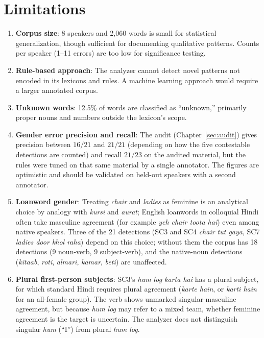 \documentclass[11pt,a4paper]{report}
\begin{document}
\section{Limitations}
\label{sec:limits}

\begin{enumerate}
  \item \textbf{Corpus size}: 8 speakers and 2,060 words is small for statistical generalization, though sufficient for documenting qualitative patterns. Counts per speaker (1--11 errors) are too low for significance testing.
  \item \textbf{Rule-based approach}: The analyzer cannot detect novel patterns not encoded in its lexicons and rules. A machine learning approach would require a larger annotated corpus.
  \item \textbf{Unknown words}: 12.5\% of words are classified as ``unknown,'' primarily proper nouns and numbers outside the lexicon's scope.
  \item \textbf{Gender error precision and recall}: The audit (Chapter~\ref{sec:audit}) gives precision between $16/21$ and $21/21$ (depending on how the five contestable detections are counted) and recall $21/23$ on the audited material, but the rules were tuned on that same material by a single annotator. The figures are optimistic and should be validated on held-out speakers with a second annotator.
  \item \textbf{Loanword gender}: Treating \textit{chair} and \textit{ladies} as feminine is an analytical choice by analogy with \textit{kursi} and \textit{aurat}; English loanwords in colloquial Hindi often take masculine agreement (for example \textit{yeh chair toota hai}) even among native speakers. Three of the 21 detections (SC3 and SC4 \textit{chair tut gaya}, SC7 \textit{ladies door khol raha}) depend on this choice; without them the corpus has 18 detections (9 noun-verb, 9 subject-verb), and the native-noun detections (\textit{kitaab}, \textit{roti}, \textit{almari}, \textit{kamar}, \textit{beti}) are unaffected.
  \item \textbf{Plural first-person subjects}: SC3's \textit{hum log karta hai} has a plural subject, for which standard Hindi requires plural agreement (\textit{karte hain}, or \textit{karti hain} for an all-female group). The verb shows unmarked singular-masculine agreement, but because \textit{hum log} may refer to a mixed team, whether feminine agreement is the target is uncertain. The analyzer does not distinguish singular \textit{hum} (``I'') from plural \textit{hum log}.

\end{enumerate}
\end{document}
